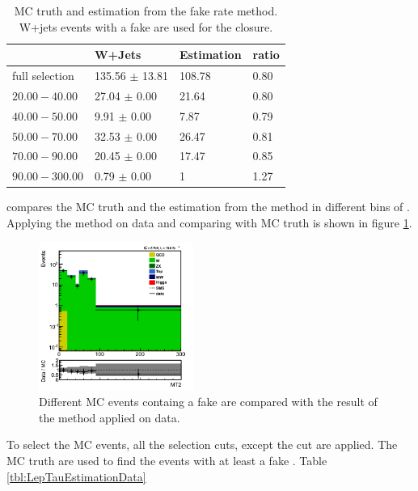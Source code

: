 \begin{table}
\begin{center}
\begin{tabular}{llll}
\hline
\hline
               &  W+Jets& Estimation & ratio\\
\hline
\hline
full selection &  135.56 $\pm$ 13.81 & 108.78    & 0.80 \\
$20.00-40.00$  &  27.04 $\pm$ 0.00   & 21.64     & 0.80 \\
$40.00-50.00$  &  9.91 $\pm$ 0.00    & 7.87      & 0.79 \\
$50.00-70.00$  &  32.53 $\pm$ 0.00   & 26.47     & 0.81 \\
$70.00-90.00$  &  20.45 $\pm$ 0.00   & 17.47     & 0.85 \\
$90.00-300.00$ &  0.79 $\pm$ 0.00    & 1         & 1.27\\
\hline
\hline
\end{tabular}
\caption{MC truth and estimation from the fake rate method. W+jets events with a fake \Tau are used for the closure.}
\label{tbl:LepTauEstimationClosure}
\end{center}
\end{table}
compares the MC truth and the estimation from the method in different bins of \mttwo. Applying the method on data and comparing with MC truth is 
shown in figure \ref{fig:LepTauEstimationData}.
\begin{figure}[!Hhtb]
\centering
\includegraphics[width=0.45\textwidth,keepaspectratio=true]{FakeRateMuTau/Estimation_ExtraLepExcl_SameSignWeightedHiggs.png}
\caption{Different MC events containg a fake \Tau are compared with the result of the method applied on data.}
\label{fig:LepTauEstimationData}
\end{figure}
To select the MC events, all the selection cuts, except the \mttwo cut are applied. 
The MC truth are used to find the events with at least a fake \Tau. Table \ref{tbl:LepTauEstimationData}
